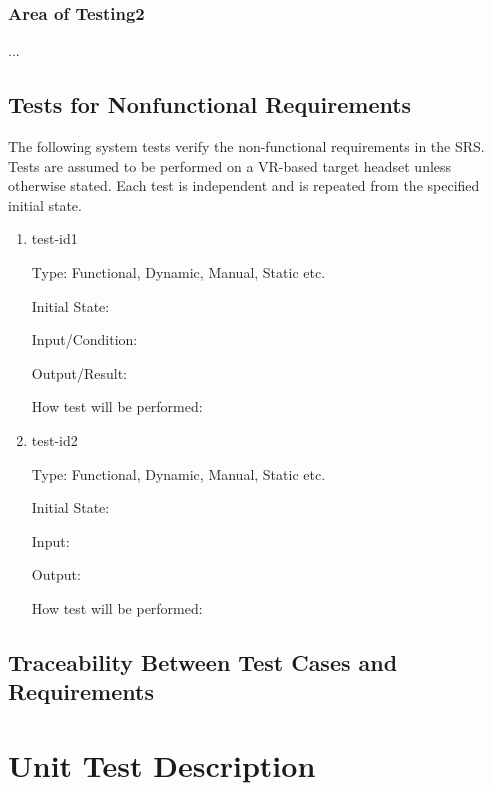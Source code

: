\documentclass[12pt, titlepage]{article}
\begin{document}
\subsubsection{Area of Testing2}

...

\subsection{Tests for Nonfunctional Requirements}

\noindent
The following system tests verify the non-functional requirements in the SRS. 
Tests are assumed to be performed on a VR-based target
headset unless otherwise stated. Each test is
independent and is repeated from the specified initial state.

\begin{enumerate}

\item{test-id1\\}

Type: Functional, Dynamic, Manual, Static etc.
					
Initial State: 
					
Input/Condition: 
					
Output/Result: 
					
How test will be performed: 
					
\item{test-id2\\}

Type: Functional, Dynamic, Manual, Static etc.
					
Initial State: 
					
Input: 
					
Output: 
					
How test will be performed: 

\end{enumerate}

\subsection{Traceability Between Test Cases and Requirements}


\section{Unit Test Description}
\end{document}
